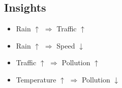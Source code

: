 \documentclass{article}
\begin{document}
\subsection{Insights}
\begin{itemize}
    \item Rain $\uparrow$ $\Rightarrow$ Traffic $\uparrow$
    \item Rain $\uparrow$ $\Rightarrow$ Speed $\downarrow$
    \item Traffic $\uparrow$ $\Rightarrow$ Pollution $\uparrow$
    \item Temperature $\uparrow$ $\Rightarrow$ Pollution $\downarrow$
\end{itemize}
\end{document}

